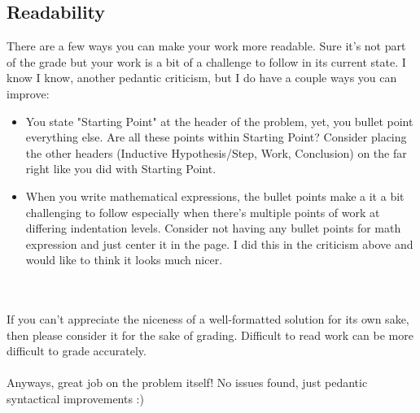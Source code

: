 \documentclass[12pt]{article}
\newcommand{\xlist}[1]{
    \begin{itemize}
        \renewcommand{\labelitemi}{$\centerdot$}
        #1
    \end{itemize}
    \newblock
    \\ \\
}
\begin{document}
\subsection*{Readability}
There are a few ways you can make your work more readable. Sure it's not part of the grade but your work is a bit of a challenge to follow in its current state. I know I know, another pedantic criticism, but I do have a couple ways you can improve:
\xlist{
  \item You state "Starting Point" at the header of the problem, yet, you bullet point everything else. Are all these points within Starting Point? Consider placing the other headers (Inductive Hypothesis/Step, Work, Conclusion) on the far right like you did with Starting Point.
  \item When you write mathematical expressions, the bullet points make a it a bit challenging to follow especially when there's multiple points of work at differing indentation levels. Consider not having any bullet points for math expression and just center it in the page. I did this in the criticism above and would like to think it looks much nicer. 
}
If you can't appreciate the niceness of a well-formatted solution for its own sake, then please consider it for the sake of grading. Difficult to read work can be more difficult to grade accurately.
\\ \\
Anyways, great job on the problem itself! No issues found, just pedantic syntactical improvements :)
 
\end{document}
